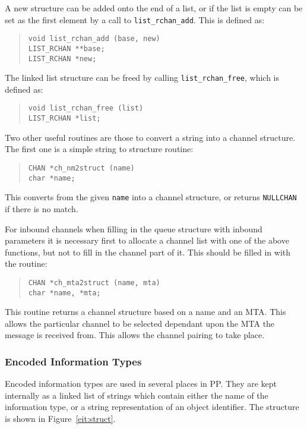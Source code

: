 A new structure can be added onto the end of a list, or if the list is
empty can be set as the first element by a call to
\verb|list_rchan_add|. This is defined as:
\begin{quote}\begin{verbatim}
void list_rchan_add (base, new)
LIST_RCHAN **base;
LIST_RCHAN *new;
\end{verbatim}\end{quote}

The linked list structure can be freed by calling
\verb|list_rchan_free|, which is defined as:
\begin{quote}\begin{verbatim}
void list_rchan_free (list)
LIST_RCHAN *list;
\end{verbatim}\end{quote}

Two other useful routines are those to convert a string into a channel
structure. The first one is a simple string to structure routine:
\begin{quote}\begin{verbatim}
CHAN *ch_nm2struct (name)
char *name;
\end{verbatim}\end{quote}
This converts from the given \verb|name| into a channel structure, or
returns \verb|NULLCHAN| if there is no match.

For inbound channels when filling in the queue structure with inbound
parameters it is necessary first to allocate a channel list with one
of the above functions, but not to fill in the channel part of it.
This should be filled in with the routine:
\begin{quote}\begin{verbatim}
CHAN *ch_mta2struct (name, mta)
char *name, *mta;
\end{verbatim}\end{quote}
This routine returns a channel structure based on a name and an MTA.
This allows the particular channel to be selected dependant upon the
MTA the message is received from. This allows the channel pairing to
take place.

\subsubsection{Encoded Information Types}
Encoded information types are used in several places in PP. They are
kept internally as a linked list of strings which contain either the
name of the information type, or a string representation of an object
identifier. The structure is shown in Figure~\ref{eit:struct}.

